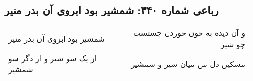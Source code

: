 \begin{center}
\section*{رباعی شماره ۳۴۰: شمشیر بود ابروی آن بدر منیر}
\label{sec:sh340}
\begin{longtable}{l p{0.5cm} r}
شمشیر بود ابروی آن بدر منیر
&&
و آن دیده به خون خوردن چستست چو شیر
\\
از یک سو شیر و از دگر سو شمشیر
&&
مسکین دل من میان شیر و شمشیر
\\
\end{longtable}
\end{center}
